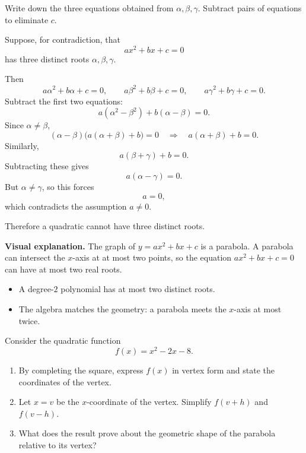 \begin{hint}
Write down the three equations obtained from $\alpha,\beta,\gamma$. Subtract pairs of equations to eliminate $c$.
\end{hint}

\begin{solution}
Suppose, for contradiction, that
\[
ax^2+bx+c=0
\]
has three distinct roots $\alpha,\beta,\gamma$.

Then
\[
a\alpha^2+b\alpha+c=0,
\qquad
a\beta^2+b\beta+c=0,
\qquad
a\gamma^2+b\gamma+c=0.
\]
Subtract the first two equations:
\[
a(\alpha^2-\beta^2)+b(\alpha-\beta)=0.
\]
Since $\alpha\ne\beta$,
\[
(\alpha-\beta)\bigl(a(\alpha+\beta)+b\bigr)=0
\quad\Longrightarrow\quad
a(\alpha+\beta)+b=0.
\]
Similarly,
\[
a(\beta+\gamma)+b=0.
\]
Subtracting these gives
\[
a(\alpha-\gamma)=0.
\]
But $\alpha\ne\gamma$, so this forces
\[
a=0,
\]
which contradicts the assumption $a\ne 0$.

Therefore a quadratic cannot have three distinct roots.

\textbf{Visual explanation.} The graph of $y=ax^2+bx+c$ is a parabola. A parabola can intersect the $x$-axis at at most two points, so the equation $ax^2+bx+c=0$ can have at most two real roots.
\end{solution}

\begin{takeaways}
\begin{itemize}[leftmargin=*]
\item A degree-$2$ polynomial has at most two distinct roots.
\item The algebra matches the geometry: a parabola meets the $x$-axis at most twice.
\end{itemize}
\end{takeaways}

\begin{problem}
Consider the quadratic function
\[
f(x)=x^2-2x-8.
\]
\begin{enumerate}[label=(\alph*)]
\item By completing the square, express $f(x)$ in vertex form and state the coordinates of the vertex.
\item Let $x=v$ be the $x$-coordinate of the vertex. Simplify $f(v+h)$ and $f(v-h)$.
\item What does the result prove about the geometric shape of the parabola relative to its vertex?
\end{enumerate}
\end{problem}


